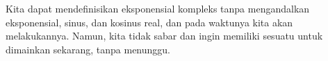 
Kita dapat mendefinisikan eksponensial kompleks tanpa mengandalkan
eksponensial, sinus, dan kosinus real, dan pada waktunya kita akan melakukannya.
Namun, kita tidak sabar dan ingin memiliki sesuatu untuk dimainkan sekarang,
tanpa menunggu.
